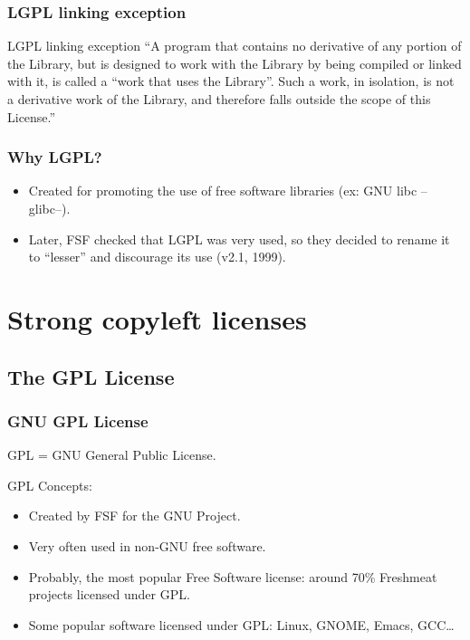 \documentclass{beamer}
\begin{document}
\begin{frame}
\frametitle{LGPL linking exception}
\begin{block}{LGPL linking exception}
``A program that contains no derivative of any portion of the Library, but is designed to work with the Library by being compiled or linked with it, is called a ``work that uses the Library''. Such a work, in isolation, is not a derivative work of the Library, and therefore falls outside the scope of this License.''

\end{block}
\end{frame}


\begin{frame}
\frametitle{Why LGPL?}


\begin{itemize}
\item Created for promoting the use of free software libraries (ex: GNU libc --glibc--).
\item Later, FSF checked that LGPL was very used, so they decided to rename it 
  to ``lesser'' and discourage its use (v2.1, 1999).
\end{itemize}

\end{frame}


\section{Strong copyleft licenses}
\subsection{The GPL License}
\begin{frame}
\frametitle{GNU GPL License}

\begin{center}
\item GPL = GNU General Public License.
\end{center}

GPL Concepts:
\begin{itemize}
\item Created by FSF for the GNU Project.
\item Very often used in non-GNU free software.
\item Probably, the most popular Free Software license: around 70\%
  Freshmeat projects licensed under GPL.
\item Some popular software licensed under GPL: Linux, GNOME, Emacs,
 GCC\ldots
\end{itemize}

\end{frame}
\end{document}
